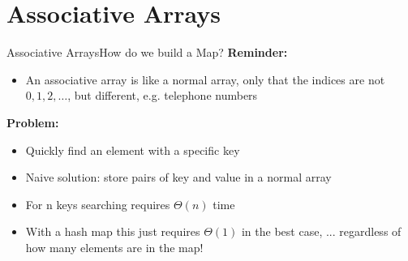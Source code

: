 \section{Associative Arrays}


\begin{frame}{Associative Arrays}{How do we build a Map?}
  \textbf{Reminder:}
  \begin{itemize}
  \item An associative array is like a normal array, only that
    the indices are not {\color{MainA}$0, 1, 2, \ldots$}, but
    different, e.g. telephone numbers
  \end{itemize}
  \textbf{Problem:}
  \begin{itemize}
  \item Quickly find an element with a specific key
  \item Naive solution: store pairs of key and value
    in a normal array
  \item For {\color{MainA}n} keys searching requires {\color{MainA} $\Theta(n)$} time
  \item With a {\color{MainA}hash map} this just requires {\color{MainA} $\Theta(1)$}
    in the best case, ... regardless of how many elements are in the map!
  \end{itemize}
\end{frame}

